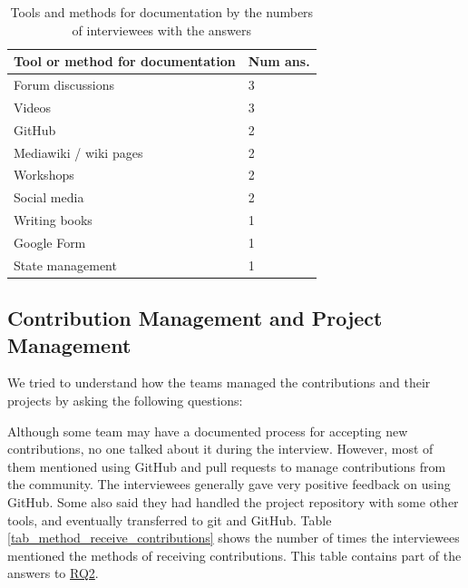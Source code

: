 \documentclass[final, 3p, times, authoryear]{elsarticle}
\begin{document}
\begin{table}[ht]
\centering
\begin{tabular}{ll}
\hline
Tool or method for documentation & Num ans. \\ \hline
Forum discussions & 3 \\
Videos & 3 \\
GitHub & 2 \\
Mediawiki / wiki pages & 2 \\
Workshops & 2 \\
Social media & 2 \\
Writing books & 1 \\
Google Form & 1 \\
State management & 1 \\ \hline
\end{tabular}
\caption{\label{tab_doc_tools}Tools and methods for documentation by the numbers
of interviewees with the answers}
\end{table}

\subsection{Contribution Management and Project Management}
\label{sec_contribution_pm}
We tried to understand how the teams managed the contributions and their
projects by asking the following questions:


Although some team may have a documented process for accepting new
contributions, no one talked about it during the interview. However, most of
them mentioned using GitHub and pull requests to manage contributions from the
community. The interviewees generally gave very positive feedback on using
GitHub. Some also said they had handled the project repository with some other
tools, and eventually transferred to git and GitHub. Table
\ref{tab_method_receive_contributions} shows the number of times the
interviewees mentioned the methods of receiving contributions. This table
contains part of the answers to \hyperlink{rq2}{RQ2}.
\end{document}
